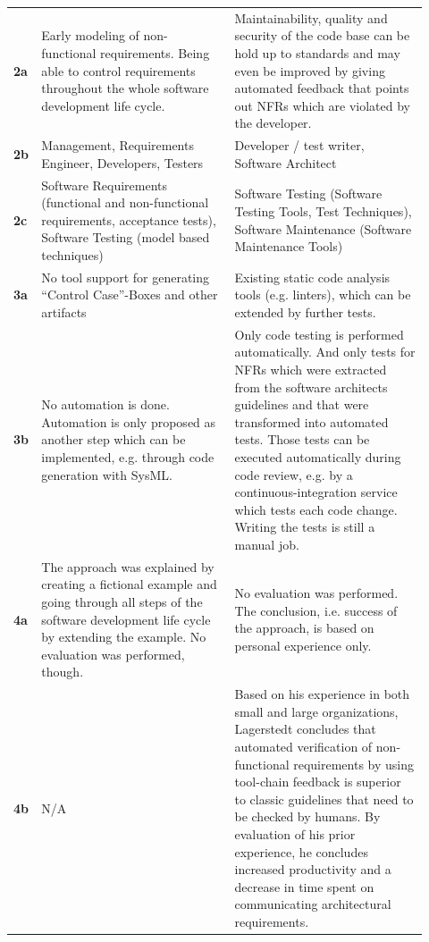 \begin{longtable}[h]{p{0.02\linewidth}p{0.45\linewidth}p{0.45\linewidth}}
	\textbf{2a} & 
	
	Early modeling of non-functional requirements. Being able to control requirements throughout the whole software development life cycle.
	
	&
	Maintainability, quality and security of the code base can be hold up to standards and may even be improved by giving automated feedback that points out NFRs which are violated by the developer.
	
	\\
	
	\textbf{2b} & 
	Management, Requirements Engineer, Developers, Testers
	&
	Developer / test writer, Software Architect
	\\
	
	\textbf{2c} &
	Software Requirements (functional and non-functional requirements, acceptance tests), Software Testing (model based techniques)
	&
	Software Testing (Software Testing Tools, Test Techniques), Software Maintenance (Software Maintenance Tools) \\
	
	\textbf{3a} & 
	No tool support for generating \enquote{Control Case}-Boxes and other artifacts &
	Existing static code analysis tools (e.g. linters), which can be extended by further tests.
	\\
	\textbf{3b} & 
	No automation is done. Automation is only proposed as another step which can be implemented, e.g. through code generation with SysML.
	&
	Only code testing is performed automatically.
	And only tests for NFRs which were extracted from the software architects guidelines and that were transformed into automated tests.
	Those tests can be executed automatically during code review, e.g. by a continuous-integration service which tests each code change. Writing the tests is still a manual job.
	\\
	
	\textbf{4a} 	
	&
	The approach was explained by creating a fictional example and going through all steps of the software development life cycle by extending the example. No evaluation was performed, though.
	
	&
	No evaluation was performed. The conclusion, i.e. success of the approach, is based on personal experience only.
	\\
	
	\textbf{4b} &
	N/A &
	
	Based on his experience in both small and large organizations, Lagerstedt concludes that automated verification of non-functional requirements by using tool-chain feedback is superior to classic guidelines that need to be checked by humans. By evaluation of his prior experience, he concludes increased productivity and a decrease in time spent on communicating architectural requirements. \\
\end{longtable}


